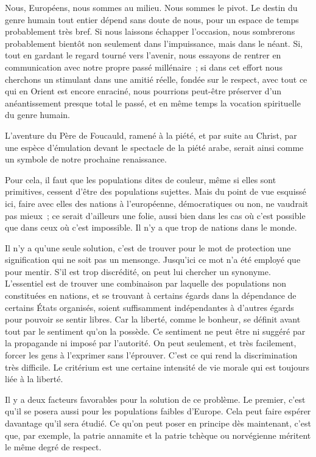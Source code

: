 \documentclass[french,twoside]{book} %
\begin{document}
Nous, Européens, nous sommes au milieu. Nous sommes le pivot. Le destin du genre humain tout entier dépend sans doute de nous, pour un espace de temps probablement très bref. Si nous laissons échapper l'occasion, nous sombrerons probablement bientôt non seulement dans l'impuissance, mais dans le néant. Si, tout en gardant le regard tourné vers l'avenir, nous essayons de rentrer en communication avec notre propre passé millénaire ; si dans cet effort nous cherchons un stimulant dans une amitié réelle, fondée sur le respect, avec tout ce qui en Orient est encore enraciné, nous pourrions peut-être préserver d'un anéantissement presque total le passé, et en même temps la vocation spirituelle du genre humain.\par
L'aventure du Père de Foucauld, ramené à la piété, et par suite au Christ, par une espèce d'émulation devant le spectacle de la piété arabe, serait ainsi comme un symbole de notre prochaine renaissance.\par
Pour cela, il faut que les populations dites de couleur, même si elles sont primitives, cessent d'être des populations sujettes. Mais du point de vue esquissé ici, faire avec elles des nations à l'européenne, démocratiques ou non, ne vaudrait pas mieux ; ce serait d'ailleurs une folie, aussi bien dans les cas où c'est possible que dans ceux où c'est impossible. Il n'y a que trop de nations dans le monde.\par
Il n'y a qu'une seule solution, c'est de trouver pour le mot de protection une signification qui ne soit pas un mensonge. Jusqu'ici ce mot n'a été em­ployé que pour mentir. S'il est trop discrédité, on peut lui chercher un synony­me. L'essentiel est de trouver une combinaison par laquelle des populations non constituées en nations, et se trouvant à certains égards dans la dépendance de certains États organisés, soient suffisamment indépendantes à d'autres égards pour pouvoir se sentir libres. Car la liberté, comme le bonheur, se définit avant tout par le sentiment qu'on la possède. Ce sentiment ne peut être ni suggéré par la propagande ni imposé par l'autorité. On peut seulement, et très facilement, forcer les gens à l'exprimer sans l'éprouver. C'est ce qui rend la discrimination très difficile. Le critérium est une certaine intensité de vie morale qui est toujours liée à la liberté.\par
Il y a deux facteurs favorables pour la solution de ce problème. Le premier, c'est qu'il se posera aussi pour les populations faibles d'Europe. Cela peut faire espérer davantage qu'il sera étudié. Ce qu'on peut poser en principe dès maintenant, c'est que, par exemple, la patrie annamite et la patrie tchèque ou norvégienne méritent le même degré de respect.\par
\end{document}

